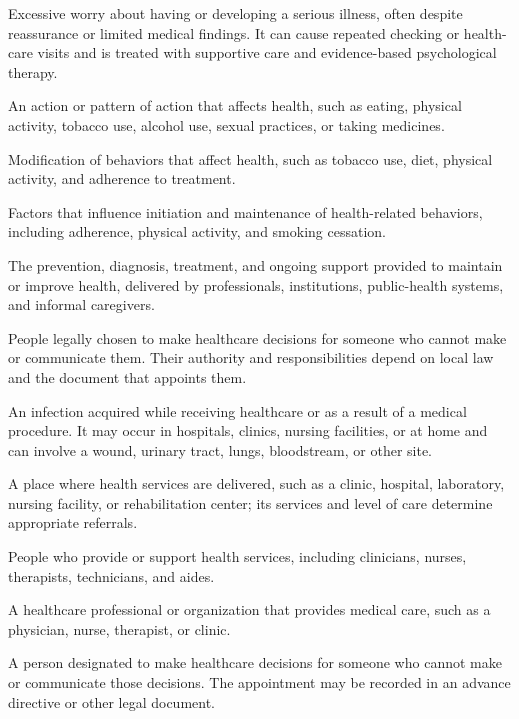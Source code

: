  Excessive worry about having or developing a serious illness, often despite reassurance or limited medical findings. It can cause repeated checking or health-care visits and is treated with supportive care and evidence-based psychological therapy.

 An action or pattern of action that affects health, such as eating, physical activity, tobacco use, alcohol use, sexual practices, or taking medicines.

 Modification of behaviors that affect health, such as tobacco use, diet, physical
activity, and adherence to treatment.

 Factors that influence initiation and maintenance of health-related behaviors, including
adherence, physical activity, and smoking cessation.

 The prevention, diagnosis, treatment, and ongoing support provided to maintain or improve health, delivered by professionals, institutions, public-health systems, and informal caregivers.

 People legally chosen to make healthcare decisions for someone who cannot make or communicate them. Their authority and responsibilities depend on local law and the document that appoints them.

 An infection acquired while receiving healthcare or as a result of a medical procedure. It may occur in hospitals, clinics, nursing facilities, or at home and can involve a wound, urinary tract, lungs, bloodstream, or other site.

 A place where health services are delivered, such as a clinic, hospital, laboratory, nursing facility, or rehabilitation center; its services and level of care determine appropriate referrals.

 People who provide or support health services, including clinicians, nurses, therapists, technicians, and aides.

 A healthcare professional or organization that provides medical care, such as a
physician, nurse, therapist, or clinic.

 A person designated to make healthcare decisions for someone who cannot make or communicate those decisions. The appointment may be recorded in an advance directive or other legal document.

